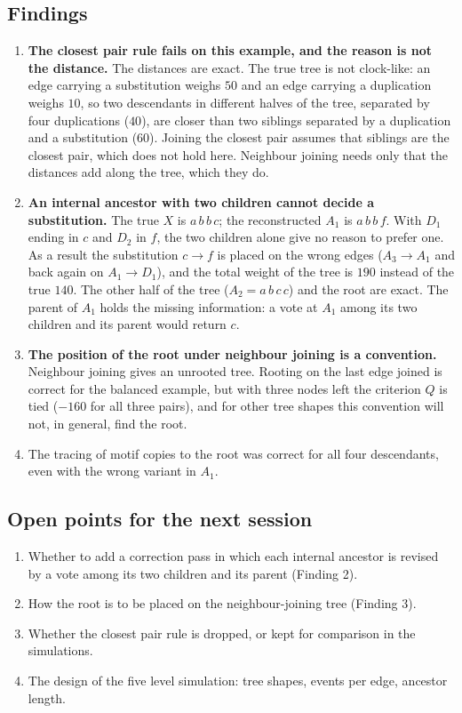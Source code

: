 \documentclass[11pt,a4paper]{article}
\begin{document}
\subsection{Findings}
\begin{enumerate}
\item \textbf{The closest pair rule fails on this example, and the reason is not the distance.}
  The distances are exact. The true tree is not clock-like: an edge carrying a substitution
  weighs $50$ and an edge carrying a duplication weighs $10$, so two descendants in different
  halves of the tree, separated by four duplications ($40$), are closer than two siblings
  separated by a duplication and a substitution ($60$). Joining the closest pair assumes that
  siblings are the closest pair, which does not hold here. Neighbour joining needs only that the
  distances add along the tree, which they do.
\item \textbf{An internal ancestor with two children cannot decide a substitution.} The true
  $X$ is $a\,b\,b\,c$; the reconstructed $A_1$ is $a\,b\,b\,f$. With $D_1$ ending in $c$ and
  $D_2$ in $f$, the two children alone give no reason to prefer one. As a result the
  substitution $c\to f$ is placed on the wrong edges ($A_3\to A_1$ and back again on
  $A_1\to D_1$), and the total weight of the tree is $190$ instead of the true $140$. The other
  half of the tree ($A_2 = a\,b\,c\,c$) and the root are exact. The parent of $A_1$ holds the
  missing information: a vote at $A_1$ among its two children and its parent would return $c$.
\item \textbf{The position of the root under neighbour joining is a convention.} Neighbour
  joining gives an unrooted tree. Rooting on the last edge joined is correct for the balanced
  example, but with three nodes left the criterion $Q$ is tied ($-160$ for all three pairs), and
  for other tree shapes this convention will not, in general, find the root.
\item The tracing of motif copies to the root was correct for all four descendants, even with
  the wrong variant in $A_1$.
\end{enumerate}

\subsection{Open points for the next session}
\begin{enumerate}
\item Whether to add a correction pass in which each internal ancestor is revised by a vote among
  its two children and its parent (Finding 2).
\item How the root is to be placed on the neighbour-joining tree (Finding 3).
\item Whether the closest pair rule is dropped, or kept for comparison in the simulations.
\item The design of the five level simulation: tree shapes, events per edge, ancestor length.
\end{enumerate}
\end{document}
